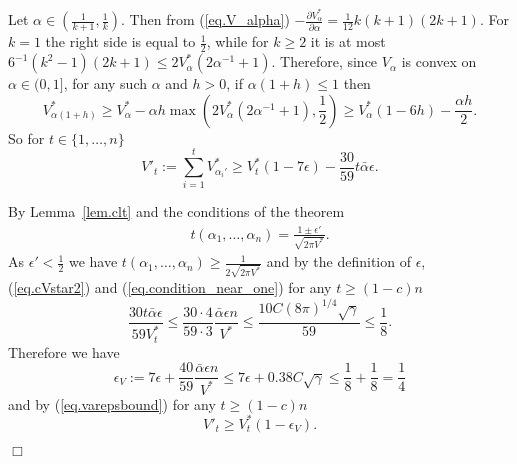 \documentclass{article}
\newenvironment{proofof}[1]{\noindent {\bf Proof of #1}}{\hspace*{\fill}$\Box$}
\begin{document}
\begin{proofof}{Theorem~\ref{thm.main}}
    Let $\alpha \in (\frac 1 {k+1}, \frac 1 k)$. Then from (\ref{eq.V_alpha}) 
    $-\frac {\partial V_\alpha^*} {\partial \alpha} = \frac 1 {12} k (k+1) (2 k + 1)$.  For $k=1$ the right side is equal to $\frac 1 2$, while for $k\ge 2$ it is at most $6^{-1} (k^2-1) (2 k + 1)  \le 2V^*_{\alpha} (2\alpha^{-1} + 1)$. Therefore, since $V_{\alpha}$ is convex on $\alpha \in (0,1]$, for any such $\alpha$ and $h > 0$, if $\alpha(1+h) \le 1$ then
    \[
        V_{\alpha (1+h)}^* \ge V_{\alpha}^* - \alpha h \max(2 V_{\alpha}^* (2 \alpha^{-1} + 1), \frac 1 2) \ge V_{\alpha}^*(1-6h) - \frac{\alpha h} 2.
    \]
    So for $t \in \{1, \dots, n\}$
    \begin{equation}\label{eq.varepsbound}
        V'_t := \sum_{i=1}^{t}V_{\alpha_i'}^*
\ge  V^*_{t} (1 - 7 \epsilon) - \frac {30} {59} t \bar{\alpha} \epsilon.
    \end{equation}

    By Lemma~\ref{lem.clt} and the conditions of the theorem
    \begin{align*}
       t(\alpha_1, \dots, \alpha_n) = \frac {1 \pm \epsilon'} {\sqrt {2 \pi V^*}}. 
    \end{align*}
    As $\epsilon' < \frac 1 2$ we have $t(\alpha_1, \dots, \alpha_n) \ge \frac 1 {2\sqrt{2\pi V^*}}$ and by the definition of $\epsilon$, (\ref{eq.cVstar2}) and  (\ref{eq.condition_near_one}) for any $t \ge (1-c) n$
    \[
        \frac {30 t \bar{\alpha} \epsilon} {59 V^*_t} \le   \frac {30 \cdot 4} {59 \cdot 3} \frac {\bar{\alpha} \epsilon n} {V^*} \le \frac {10 C (8 \pi)^{1/4} \sqrt{\gamma}} {59} \le \frac 1 8.
    \]
    Therefore we have
    \begin{equation}\label{eq.epsilon_V}
        \epsilon_V := 7 \epsilon + \frac {40} {59} \frac{\bar{\alpha} \epsilon n} {V^*}        \le 7 \epsilon + 0.38 C \sqrt{\gamma} 
        \le \frac 1 8 + \frac 1 8 =  \frac 1 4
    \end{equation}
    and by (\ref{eq.varepsbound}) for any $t \ge (1-c) n$
    \begin{equation}\label{eq.V_prime}
        V'_t \ge V^*_t (1 - \epsilon_V).
    \end{equation}


\end{proofof}
\end{document}
